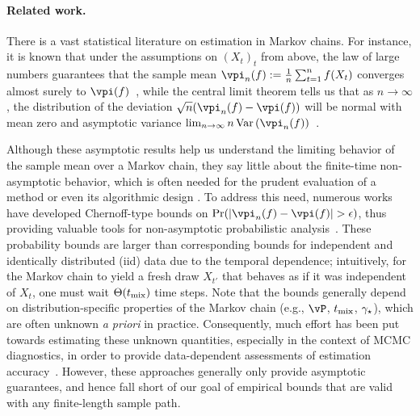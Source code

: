 \paragraph{Related work.}
There is a vast statistical literature on estimation in Markov chains.
For instance, it is known that under the assumptions on
$(X_t)_t$ from above, the law of large numbers guarantees that
the sample mean $\vpi_n(f) \defeq \frac1n \sum_{t=1}^n f(X_t)$
converges almost surely to $\vpi(f)$~\cite{meyn1993markov}, while the
central limit theorem tells us that as $n\to \infty$, the distribution
of the deviation $\sqrt{n}( \vpi_n(f)-\vpi(f))$ will be normal with
mean zero and asymptotic variance $\lim_{n\to\infty}
n\Var\Parens{\vpi_n(f)}$~\cite{kipnis1986central}.

Although these asymptotic results help us understand the limiting
behavior of the sample mean over a Markov chain, they say little about
the finite-time non-asymptotic behavior, which is often needed for the
prudent evaluation of a method or even its algorithmic design
\cite{
MCMCDiscussion93%
,DBLP:conf/valuetools/KontoyiannisLM06%
,BBL06%
,MniSzeAu08%
,MauPo09%
,LiLiWaSt11:KWIK%
,flegal2011implementing%
,Gyori-paulin15%
,SwaJoa15:LoggedBandit%
}. %
To address this need, numerous works have developed Chernoff-type
bounds on $\Pr\parens{ |\vpi_n(f)-\vpi(f)| > \eps }$, thus providing
valuable tools for non-asymptotic probabilistic
analysis~\cite{gillman1998chernoff,leon2004optimal,DBLP:conf/valuetools/KontoyiannisLM06,
paulin15}.
These probability bounds are larger than corresponding bounds for
independent and identically distributed (iid) data due to the temporal
dependence; intuitively, for the Markov chain to yield a fresh draw
$X_{t'}$ that behaves as if it was independent of $X_t$, one must wait
$\Theta(t_{\operatorname{mix}})$ time steps.
Note that the bounds generally depend on distribution-specific
properties of the Markov chain (e.g., $\vP$, $t_{\operatorname{mix}}$, $\gamma_{\star}$), which are often
unknown \emph{a priori} in practice.
Consequently, much effort has been put towards estimating these
unknown quantities, especially in the context of MCMC diagnostics, in
order to provide data-dependent assessments of estimation
accuracy~\cite[e.g.,][]{MCMCDiscussion93,GaSmi00:eigval,jones2001,flegal2011implementing,1209.0703,Gyori-paulin15}.
However, these approaches generally only provide asymptotic
guarantees, and hence fall short of our goal of empirical bounds that
are valid with any finite-length sample path.

